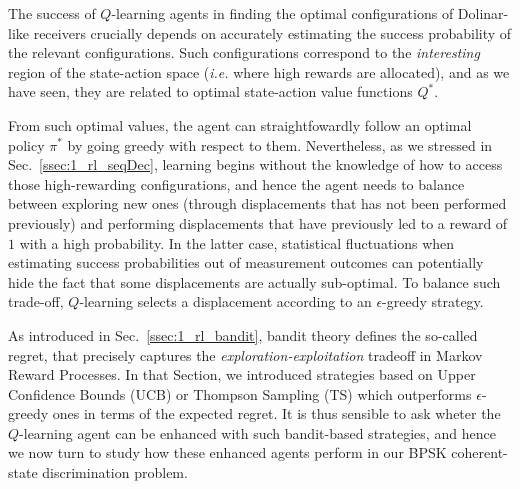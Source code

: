 The success of $Q$-learning agents in finding the optimal configurations of Dolinar-like receivers crucially depends on accurately estimating the success probability of the relevant configurations. Such configurations correspond to the \textit{interesting} region of the state-action space (\textit{i.e.} where high rewards are allocated), and as we have seen, they are related to optimal state-action value functions $Q^*$.

From such optimal values, the agent can straightfowardly follow an optimal policy $\pi^*$ by going greedy with respect to them. Nevertheless, as we stressed in Sec.~\ref{ssec:1_rl_seqDec}, learning begins without the knowledge of how to access those high-rewarding configurations, and hence the agent needs to balance between exploring new ones (through displacements that has not been performed previously) and performing displacements that have previously led to a reward of $1$ with a high probability. In the latter case, statistical fluctuations when estimating success probabilities out of measurement outcomes can potentially hide the fact that some displacements are actually sub-optimal. To balance such trade-off, $Q$-learning selects a displacement according to an $\epsilon$-greedy strategy.

As introduced in Sec.~\ref{ssec:1_rl_bandit}, bandit theory defines the so-called regret, that precisely captures the \textit{exploration-exploitation} tradeoff in Markov Reward Processes. In that Section, we introduced strategies based on Upper Confidence Bounds (UCB) or Thompson Sampling (TS) which outperforms $\epsilon$-greedy ones in terms of the expected regret. It is thus sensible to ask wheter the $Q$-learning agent can be enhanced with such bandit-based strategies, and hence we now turn to study how these enhanced agents perform in our BPSK coherent-state discrimination problem.
%
